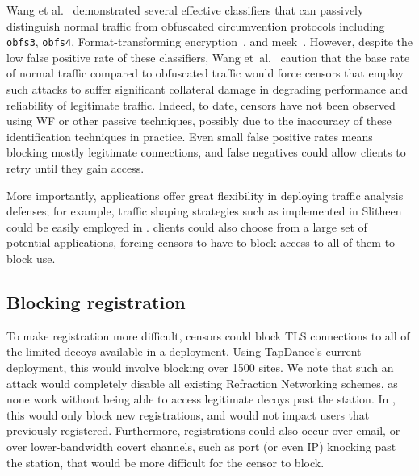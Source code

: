 \documentclass[sigconf]{acmart}
\begin{document}
Wang et al.~\cite{wang2015seeing} demonstrated several effective classifiers
that can passively distinguish normal traffic from obfuscated circumvention
protocols including \texttt{obfs3}, \texttt{obfs4}, Format-transforming
encryption~\cite{fte}, and meek~\cite{meek}. However, despite the low false
positive rate of these classifiers, Wang et~al.~\cite{wang2015seeing} caution
that the base rate of normal traffic compared to obfuscated traffic would force
censors that employ such attacks to suffer significant collateral damage in
degrading performance and reliability of legitimate traffic.
Indeed, to date, censors have not been observed using WF or other
passive techniques, possibly due to the inaccuracy of these identification
techniques in practice. Even small false positive rates means blocking mostly legitimate
connections, and false negatives could allow clients to retry until they gain
access.


More importantly, \scheme applications offer great flexibility in deploying
traffic analysis defenses; for example, traffic shaping strategies such as
implemented in Slitheen~\cite{slitheen16} could be easily employed in \scheme.
\scheme clients could also choose from a large set of potential applications,
forcing censors to have to block access to all of them to block use.



\subsection{Blocking registration}
To make registration more difficult, censors could block TLS connections to all of the
limited decoys available in a deployment. Using TapDance's current deployment,
this would involve blocking over 1500 sites. We note that such an attack would
completely disable all existing Refraction Networking schemes, as none work
without being able to access legitimate decoys past the station. In \scheme,
this would only block new registrations, and would not impact users that
previously registered. Furthermore, registrations could also occur over email,
or over lower-bandwidth covert channels, such as port (or even IP) knocking past
the station, that would be more difficult for the censor to block.
\end{document}
